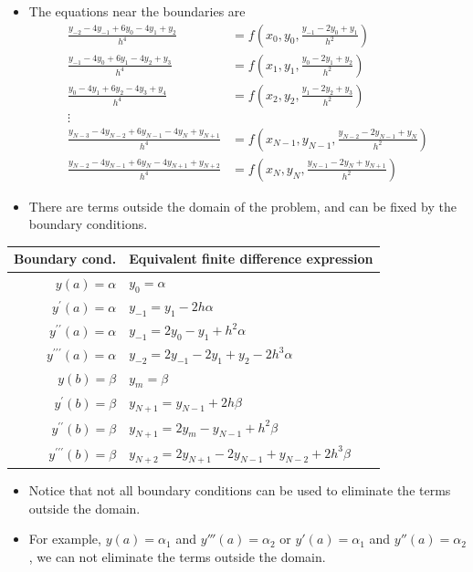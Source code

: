 \documentclass{beamer}
\newcommand{\beforeverb}{\footnotesize}
\newcommand{\afterverb}{\normalsize}
\begin{document}
\begin{frame}
    \begin{itemize}
        \item The  equations near the boundaries are
        \beforeverb
        \begin{align*}
        \frac{y_{-2}-4y_{-1}+6y_0-4y_1+y_2}{h^4}&=f\left(x_0, y_0, \frac{y_{-1}-2 y_0+y_1}{h^2}\right)\\
        \frac{y_{-1}-4y_0+6y_1-4y_2+y_3}{h^4}&=f\left(x_1, y_1, \frac{y_0-2 y_1+y_2}{h^2}\right)\\
        \frac{y_{0}-4y_1+6y_2-4y_3+y_4}{h^4}&=f\left(x_2, y_2, \frac{y_1-2 y_2+y_3}{h^2}\right)\\
        \vdots\\
        \frac{y_{N-3}-4y_{N-2}+6y_{N-1}-4y_N+y_{N+1}}{h^4}&=f\left(x_{N-1}, y_{N-1}, \frac{y_{N-2}-2 y_{N-1}+y_N}{h^2}\right)\\
        \frac{y_{N-2}-4y_{N-1}+6y_N-4y_{N+1}+y_{N+2}}{h^4}&=f\left(x_N, y_N, \frac{y_{N-1}-2 y_N+y_{N+1}}{h^2}\right)
        \end{align*}
        \afterverb
        \item There are terms outside the domain of the problem, and can be fixed by the boundary conditions.
    \end{itemize}
\end{frame}
\begin{frame}
    \begin{tabular}{|r|l|}
        \hline Boundary cond. & Equivalent finite difference expression \\
        \hline$y(a)=\alpha$ & $y_0=\alpha$ \\
        $y^{\prime}(a)=\alpha$ & $y_{-1}=y_1-2 h \alpha$ \\
        $y^{\prime \prime}(a)=\alpha$ & $y_{-1}=2 y_0-y_1+h^2 \alpha$ \\
        $y^{\prime \prime \prime}(a)=\alpha$ & $y_{-2}=2 y_{-1}-2 y_1+y_2-2 h^3 \alpha$ \\
        \hline$y(b)=\beta$ & $y_m=\beta$ \\
        $y^{\prime}(b)=\beta$ & $y_{N+1}=y_{N-1}+2 h \beta$ \\
        $y^{\prime \prime}(b)=\beta$ & $y_{N+1}=2 y_m-y_{N-1}+h^2 \beta$ \\
        $y^{\prime \prime \prime}(b)=\beta$ & $y_{N+2}=2 y_{N+1}-2 y_{N-1}+y_{N-2}+2 h^3 \beta$ \\
        \hline
        \end{tabular}

        \begin{itemize}
            \item Notice that not all boundary conditions can be used to eliminate the terms outside the domain.
            \item  For example, $y(a)=\alpha_1$ and $y'''(a)=\alpha_2$ or $y'(a)=\alpha_1$ and $y''(a)=\alpha_2$, 
            we can not eliminate the terms outside the domain. 
        \end{itemize}
        
\end{frame}
\end{document}

